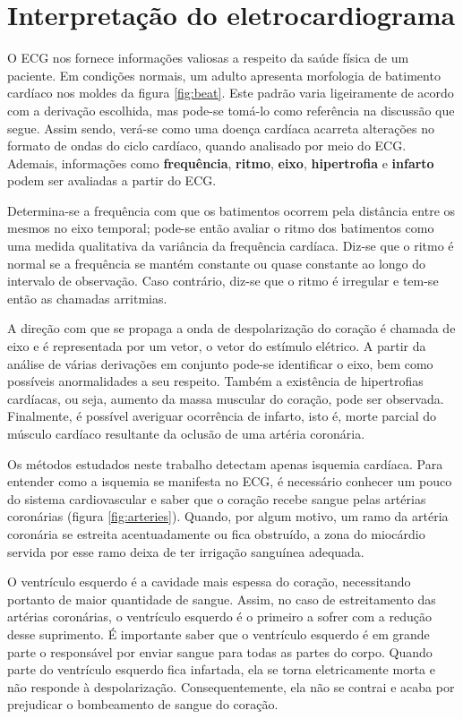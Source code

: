 \section{Interpretação do eletrocardiograma}
O ECG nos fornece informações valiosas a respeito da saúde física de um paciente. Em condições normais, um adulto apresenta morfologia de batimento cardíaco nos moldes da figura \ref{fig:beat}. Este padrão varia ligeiramente de acordo com a derivação escolhida, mas pode-se tomá-lo como referência na discussão que segue. Assim sendo, verá-se como uma doença cardíaca acarreta alterações no formato de ondas do ciclo cardíaco, quando analisado por meio do ECG. Ademais, informações como \textbf{frequência}, \textbf{ritmo}, \textbf{eixo}, \textbf{hipertrofia} e \textbf{infarto} podem ser avaliadas a partir do ECG. 

Determina-se a frequência com que os batimentos ocorrem pela distância entre os mesmos no eixo temporal; pode-se então avaliar o ritmo dos batimentos como uma medida qualitativa da variância da frequência cardíaca. Diz-se que o ritmo é normal se a frequência se mantém constante ou quase constante ao longo do intervalo de observação. Caso contrário, diz-se que o ritmo é irregular e tem-se então as chamadas arritmias.

A direção com que se propaga a onda de despolarização do coração é chamada de eixo e é representada por um vetor, o vetor do estímulo elétrico. A partir da análise de várias derivações em conjunto pode-se identificar o eixo, bem como possíveis anormalidades a seu respeito. Também a existência de hipertrofias cardíacas, ou seja, aumento da massa muscular do coração, pode ser observada. Finalmente, é possível averiguar ocorrência de infarto, isto é, morte parcial do músculo cardíaco resultante da oclusão de uma artéria coronária.

Os métodos estudados neste trabalho detectam apenas isquemia cardíaca. Para entender como a isquemia se manifesta no ECG, é necessário conhecer um pouco do sistema cardiovascular e saber que o coração recebe sangue pelas artérias coronárias (figura \ref{fig:arteries}). Quando, por algum motivo, um ramo da artéria coronária se estreita acentuadamente ou fica obstruído, a zona do miocárdio servida por esse ramo deixa de ter irrigação sanguínea adequada.

O ventrículo esquerdo é a cavidade mais espessa do coração, necessitando portanto de maior quantidade de sangue. Assim, no caso de estreitamento das artérias coronárias, o ventrículo esquerdo é o primeiro a sofrer com a redução desse suprimento. É importante saber que o ventrículo esquerdo é em grande parte o responsável por enviar sangue para todas as partes do corpo. Quando parte do ventrículo esquerdo fica infartada, ela se torna eletricamente morta e não responde à despolarização. Consequentemente, ela não se contrai e acaba por prejudicar o bombeamento de sangue do coração. 

